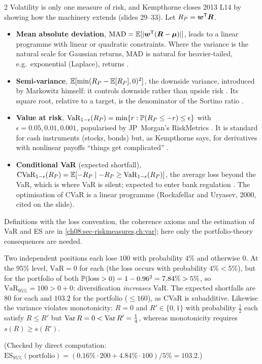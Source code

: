 \begin{paracol}{2}
Volatility is only one measure of risk, and Kempthorne closes 2013 L14 by showing how the machinery extends
 (slides 29--33). Let $R_P=\bm w^{\mathsf T}\bm R$.
\begin{itemize}
  \item \textbf{Mean absolute deviation}, $\mathrm{MAD}=\mathbb{E}[|\bm w^{\mathsf T}(\bm R-\bm\mu)|]$, leads to a linear programme with linear or
        quadratic constraints. Where the variance is the natural scale for Gaussian returns, MAD is natural for
        heavier-tailed, e.g.\ exponential (Laplace), returns .
  \item \textbf{Semi-variance}, $\mathbb{E}[\min(R_P-\mathbb{E}[R_P],0)^2]$, the downside variance, introduced by Markowitz himself:
        it controls downside rather than upside risk . Its square root, relative to a target,
        is the denominator of the Sortino ratio .
  \item \textbf{Value at risk}, $\mathrm{VaR}_{1-\epsilon}(R_P)=\min\{r:\mathbb{P}(R_P\le-r)\le\epsilon\}$ with $\epsilon=0.05,0.01,0.001$,
        popularised by JP~Morgan's RiskMetrics . It is standard for cash instruments (stocks, bonds) but,
        as Kempthorne says, for derivatives with nonlinear payoffs ``things get complicated'' .
  \item \textbf{Conditional VaR} (expected shortfall), $\mathrm{CVaR}_{1-\epsilon}(R_P)=\mathbb{E}[-R_P\mid-R_P\ge\mathrm{VaR}_{1-\epsilon}(R_P)]$, the average
        loss beyond the VaR, which is where VaR is silent; expected to enter bank regulation
        . The optimisation of CVaR is a linear programme (Rockafellar and Uryasev, 2000, cited on the slide).
\end{itemize}
Definitions with the loss convention, the coherence axioms and the estimation of VaR and ES are in
\cref{ch08:sec-riskmeasures,ch:var}; here only the portfolio-theory consequences are needed.

\begin{proposition}\label{ch10:prop-var}
Two independent positions each lose $100$ with probability $4\%$ and otherwise $0$. At the $95\%$ level,
$\mathrm{VaR}=0$ for each (the loss occurs with probability $4\%<5\%$), but for the portfolio of both
$\mathbb{P}(\text{loss}>0)=1-0.96^2=7.84\%>5\%$, so $\mathrm{VaR}_{95\%}=100>0+0$: diversification \emph{increases} VaR.
The expected shortfalls are $80$ for each and $103.2$ for the portfolio ($\le160$), as CVaR is subadditive. Likewise
the variance violates monotonicity: $R=0$ and $R'\in\{0,1\}$ with probability $\frac12$ each satisfy $R\le R'$ but
$\operatorname{Var} R=0<\operatorname{Var} R'=\frac14$, whereas monotonicity requires $s(R)\ge s(R')$.
\end{proposition}
\noindent (Checked by direct computation: $\mathrm{ES}_{95\%}(\text{portfolio})=(0.16\%\cdot200+4.84\%\cdot100)/5\%=103.2$.)


\end{paracol}
